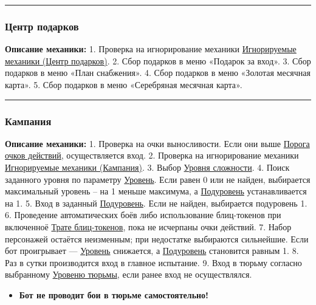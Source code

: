 \documentclass[
]{article}
\providecommand{\tightlist}{%
  \setlength{\itemsep}{0pt}\setlength{\parskip}{0pt}}
\begin{document}
\begin{center}\rule{0.5\linewidth}{0.5pt}\end{center}

\subsubsection{Центр
подарков}\label{ux446ux435ux43dux442ux440-ux43fux43eux434ux430ux440ux43aux43eux432}

\textbf{Описание механики:} 1. Проверка на игнорирование механики
\hyperref[ignor_states]{Игнорируемые механики (Центр подарков)}. 2. Сбор
подарков в меню «Подарок за вход». 3. Сбор подарков в меню «План
снабжения». 4. Сбор подарков в меню «Золотая месячная карта». 5. Сбор
подарков в меню «Серебряная месячная карта».

\begin{center}\rule{0.5\linewidth}{0.5pt}\end{center}

\subsubsection{Кампания}\label{ux43aux430ux43cux43fux430ux43dux438ux44f}

\textbf{Описание механики:} 1. Проверка на очки выносливости. Если они
выше \hyperref[action_points_threshold]{Порога очков действий},
осуществляется вход. 2. Проверка на игнорирование механики
\hyperref[ignor_states]{Игнорируемые механики (Кампания)}. 3. Выбор
\hyperref[company_super_level]{Уровня сложности}. 4. Поиск заданного
уровня по параметру \hyperref[company_level]{Уровень}. Если равен 0 или
не найден, выбирается максимальный уровень – на 1 меньше максимума, а
\hyperref[company_sublevel]{Подуровень} устанавливается на 1. 5. Вход в
заданный \hyperref[company_sublevel]{Подуровень}. Если не найден,
выбирается подуровень 1. 6. Проведение автоматических боёв либо
использование блиц-токенов при включенноё \hyperref[company_bliz]{Трате
блиц-токенов}, пока не исчерпаны очки действий. 7. Набор персонажей
остаётся неизменным; при недостатке выбираются сильнейшие. Если бот
проигрывает — \hyperref[company_level]{Уровень} снижается, а
\hyperref[company_sublevel]{Подуровень} становится равным 1. 8. Раз в
сутки производится вход в главное испытание. 9. Вход в тюрьму согласно
выбранному \hyperref[company_prison_level]{Уровеню тюрьмы}, если ранее
вход не осуществлялся.

\begin{itemize}
\tightlist
\item
  \textbf{{Бот не проводит бои в тюрьме самостоятельно!}}
\end{itemize}
\end{document}

